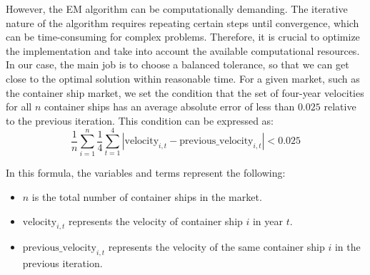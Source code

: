 \documentclass[a4paper,12pt]{article}
\begin{document}


However, the EM algorithm can be computationally demanding.
The iterative nature of the algorithm requires repeating certain steps until convergence, which can be time-consuming for complex problems.
Therefore, it is crucial to optimize the implementation and take into account the available computational resources.
In our case, the main job is to choose a balanced tolerance, so that we can get close to the optimal solution within reasonable time.
For a given market, such as the container ship market, we set the condition that the set of four-year velocities for all $n$ container ships has an average absolute error of less than $0.025$ relative to the previous iteration.
This condition can be expressed as:
\begin{equation}
	\frac{1}{n}\sum_{i=1}^{n} \frac{1}{4} \sum_{t=1}^{4} \left| \text{velocity}_{i,t} - \text{previous\_velocity}_{i,t} \right| < 0.025
\end{equation}

In this formula, the variables and terms represent the following:
\begin{itemize}
	\item $n$ is the total number of container ships in the market.
	\item $\text{velocity}_{i,t}$ represents the velocity of container ship $i$ in year $t$.
	\item $\text{previous\_velocity}_{i,t}$ represents the velocity of the same container ship $i$ in the previous iteration.
\end{itemize}
\end{document}
